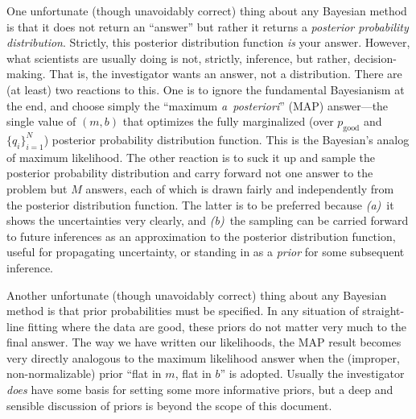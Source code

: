 \documentclass[12pt,twoside]{article}
\newcommand{\notenglish}[1]{\textsl{#1}}
\newcommand{\aposteriori}{\notenglish{a~posteriori}}
\newcommand{\documentname}{document}
\newcounter{problem}
\newcommand{\setofall}[3]{\{{#1}\}_{{#2}}^{{#3}}}
\newcommand{\allq}{\setofall{q_i}{i=1}{N}}
\newcommand{\pgood}{p_{\mathrm{good}}}
\begin{document}
One unfortunate (though unavoidably correct) thing about any Bayesian
method is that it does not return an ``answer'' but rather it returns
a \emph{posterior probability distribution}.  Strictly, this posterior
distribution function \emph{is} your answer.  However, what scientists
are usually doing is not, strictly, inference, but rather,
decision-making.  That is, the investigator wants an answer, not a
distribution.  There are (at least) two reactions to this.  One is to
ignore the fundamental Bayesianism at the end, and choose simply the
``maximum \aposteriori'' (MAP) answer---the single value of $(m,b)$
that optimizes the fully marginalized (over $\pgood$ and $\allq$)
posterior probability distribution function.  This is the Bayesian's
analog of maximum likelihood.  The other reaction is to suck it up and
sample the posterior probability distribution and carry forward not
one answer to the problem but $M$ answers, each of which is drawn
fairly and independently from the posterior distribution function.
The latter is to be preferred because \textsl{(a)}~it shows the
uncertainties very clearly, and \textsl{(b)}~the sampling can be
carried forward to future inferences as an approximation to the
posterior distribution function, useful for propagating uncertainty,
or standing in as a \emph{prior} for some subsequent inference.

Another unfortunate (though unavoidably correct) thing about any
Bayes\-ian method is that prior probabilities must be specified.  In any
situation of straight-line fitting where the data are good, these
priors do not matter very much to the final answer.  The way we have
written our likelihoods, the MAP result becomes very directly
analogous to the maximum likelihood answer when the (improper,
non-normalizable) prior ``flat in $m$, flat in $b$'' is adopted.
Usually the investigator \emph{does} have some basis for setting some
more informative priors, but a deep and sensible discussion of priors
is beyond the scope of this \documentname.
\end{document}
